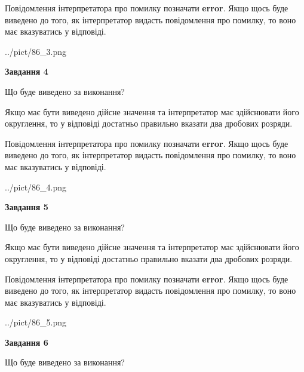 \documentclass[12pt, ukrainian]{article}
\begin{document}
{\begin {Large}
Повідомлення інтерпретатора про помилку позначати \textbf{error}.
Якщо щось буде виведено до того, як інтерпретатор видасть повідомлення про помилку, 
то воно має вказуватись у відповіді. \par

\begin{center}
	{../pict/86_3.png}
\end{center}
\newpage

{\begin {center}\textbf{Завдання 4}\end {center}}\par
Що буде виведено за виконання? \par

Якщо має бути виведено дійсне значення та інтерпретатор має здійснювати його округлення, 
то у відповіді достатньо правильно вказати два дробових розряди.

Повідомлення інтерпретатора про помилку позначати \textbf{error}.
Якщо щось буде виведено до того, як інтерпретатор видасть повідомлення про помилку, 
то воно має вказуватись у відповіді. \par

\begin{center}
	{../pict/86_4.png}
\end{center}
\newpage

{\begin {center}\textbf{Завдання 5}\end {center}}\par
Що буде виведено за виконання? \par

Якщо має бути виведено дійсне значення та інтерпретатор має здійснювати його округлення, 
то у відповіді достатньо правильно вказати два дробових розряди.

Повідомлення інтерпретатора про помилку позначати \textbf{error}.
Якщо щось буде виведено до того, як інтерпретатор видасть повідомлення про помилку, 
то воно має вказуватись у відповіді. \par

\begin{center}
	{../pict/86_5.png}
\end{center}
\newpage

{\begin {center}\textbf{Завдання 6}\end {center}}\par
Що буде виведено за виконання? \par


\end{Large}}
\end{document}
